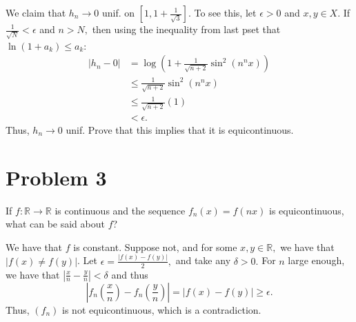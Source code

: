 \documentclass[11pt]{article}
\newcommand{\bbR}{\mathbb{R}}
\begin{document}
\begin{solution}
    We claim that $h_n \to 0$ unif. on $[1, 1 + \frac{1}{\sqrt{3}}].$ To see this, let $\epsilon>0$ and $x,y\in X.$ If $\frac{1}{\sqrt{N}}<\epsilon$ and $n>N,$ then using the inequality from last pset that $\ln(1 + a_k)\leq a_k:$
    \begin{align*}
      |h_n - 0| &= \log(1 + \frac{1}{\sqrt{n + 2}}\sin^2(n^nx))\\
      &\leq \frac{1}{\sqrt{n + 2}}\sin^2(n^nx)\\
      &\leq\frac{1}{\sqrt{n + 2}}(1)\\
      &<\epsilon.
    \end{align*}
    Thus, $h_n\to 0$ unif. Prove that this implies that it is equicontinuous.
\end{solution}

\newpage
\section*{Problem 3}
\begin{problem}
     If $f : \bbR \to \bbR$ is continuous and the sequence $f_n(x)=f(nx)$ is equicontinuous,
 what can be said about $f$?
 \end{problem}
\begin{solution}
    We have that $f$ is constant. Suppose not, and for some $x, y \in \bbR,$ we have that $|f(x)\neq f(y)|$. Let $\epsilon = \frac{|f(x) - f(y)|}{2},$ and take any $\delta>0.$ For $n$ large enough, we have that $|\frac{x}{n}-\frac{y}{n}|< \delta$ and thus 
    \[|f_n(\frac{x}{n}) - f_n(\frac{y}{n})| = |f(x) - f(y)|\geq \epsilon.\] Thus, $(f_n)$ is not equicontinuous, which is a contradiction.
\end{solution}

\newpage
\end{document}
